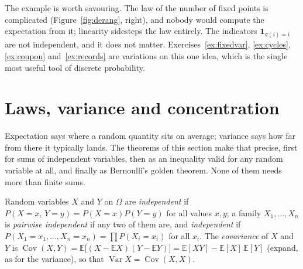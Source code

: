 The example is worth savouring. The law of the number of fixed points is complicated (Figure~\ref{fig:derang}, right), and nobody would compute the expectation from it; linearity sidesteps the law entirely. The indicators $\mathbf 1_{\sigma(i)=i}$ are not independent, and it does not matter. Exercises~\ref{ex:fixedvar}, \ref{ex:cycles}, \ref{ex:coupon} and~\ref{ex:records} are variations on this one idea, which is the single most useful tool of discrete probability.

\section{Laws, variance and concentration}

Expectation says where a random quantity sits on average; variance says how far from there it typically lands. The theorems of this section
make that precise, first for sums of independent variables, then as an inequality valid for any random variable at all, and finally as Bernoulli's
golden theorem. None of them needs more than finite sums.

\begin{definitionx}
Random variables $X$ and $Y$ on $\Omega$ are \emph{independent} if $P(X=x,\,Y=y)=P(X=x)P(Y=y)$ for all values $x,y$; a family $X_1,\dots,X_n$ is \emph{pairwise independent} if any two of them are, and \emph{independent} if $P(X_1=x_1,\dots,X_n=x_n)=\prod P(X_i=x_i)$ for all $x_i$. The \emph{covariance} of $X$ and $Y$ is $\operatorname{Cov}(X,Y)=\mathbb E\big[(X-\mathbb E X)(Y-\mathbb E Y)\big]=\mathbb E[XY]-\mathbb E[X]\,\mathbb E[Y]$ (expand, as for the variance), so that $\operatorname{Var}X=\operatorname{Cov}(X,X)$.
\end{definitionx}

